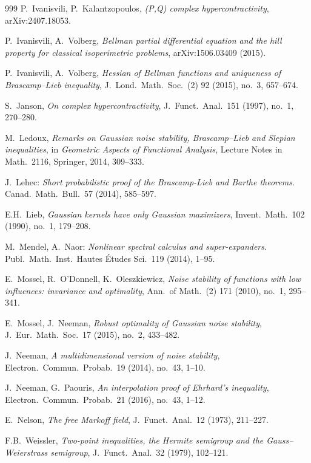 \documentclass[9pt, a4paper]{amsart}
\newcommand{\1}{{\chi_{}}}%
\numberwithin{equation}{section}
\begin{document}
\begin{thebibliography}{999}
{\sc P.~Ivanisvili, P.~Kalantzopoulos}, 
{\em (P,Q) complex hypercontractivity}, 
arXiv:2407.18053.

{\sc P.~Ivanisvili, A.~Volberg}, 
{\em Bellman partial differential equation and the hill property for classical isoperimetric problems}, 
arXiv:1506.03409 (2015).

{\sc P.~Ivanisvili, A.~Volberg}, 
{\em Hessian of Bellman functions and uniqueness of Brascamp--Lieb inequality}, 
J.\ Lond.\ Math.\ Soc.\ (2) 92 (2015), no.~3, 657--674.

{\sc S.~Janson}, 
{\em On complex hypercontractivity}, 
J.\ Funct.\ Anal.\ 151 (1997), no.~1, 270--280.

{\sc M.~Ledoux}, 
{\em Remarks on Gaussian noise stability, Brascamp--Lieb and Slepian inequalities}, 
in \emph{Geometric Aspects of Functional Analysis}, Lecture Notes in Math.\ 2116, Springer, 2014, 309--333.

{\sc J.~Lehec}: 
{\em Short probabilistic proof of the Brascamp-Lieb and Barthe theorems}. 
Canad.\ Math.\ Bull.\ 57 (2014), 585--597.

{\sc E.H.~Lieb}, 
{\em Gaussian kernels have only Gaussian maximizers}, 
Invent.\ Math.\ 102 (1990), no.~1, 179--208.

{\sc M.~Mendel, A.~Naor}: 
{\em Nonlinear spectral calculus and super-expanders}. 
Publ.\ Math.\ Inst.\ Hautes \'Etudes Sci.\ 119 (2014), 1--95.

{\sc E.~Mossel, R.~O'Donnell, K.~Oleszkiewicz}, 
{\em Noise stability of functions with low influences: invariance and optimality}, 
Ann.\ of Math.\ (2) 171 (2010), no.~1, 295--341.

{\sc E.~Mossel, J.~Neeman}, 
{\em Robust optimality of Gaussian noise stability}, 
J.\ Eur.\ Math.\ Soc.\ 17 (2015), no.~2, 433--482.

{\sc J.~Neeman}, 
{\em A multidimensional version of noise stability}, 
Electron.\ Commun.\ Probab.\ 19 (2014), no.~43, 1--10.

{\sc J.~Neeman, G.~Paouris}, 
{\em An interpolation proof of Ehrhard's inequality}, 
Electron.\ Commun.\ Probab.\ 21 (2016), no.~43, 1--12.

{\sc E.~Nelson}, 
{\em The free Markoff field}, 
J.\ Funct.\ Anal.\ 12 (1973), 211--227.

{\sc F.B.~Weissler}, 
{\em Two-point inequalities, the Hermite semigroup and the Gauss--Weierstrass semigroup}, 
J.\ Funct.\ Anal.\ 32 (1979), 102--121.

\end{thebibliography}
\end{document}
